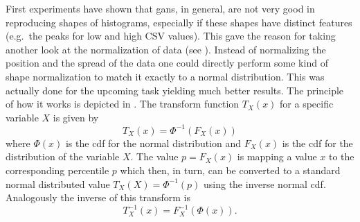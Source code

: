 First experiments have shown that \glspl{gan}, in general, are not very good in reproducing shapes of histograms, especially if these shapes have distinct features (e.g.\ the peaks for low and high CSV values). This gave the reason for taking another look at the normalization of data (see ). Instead of normalizing the position and the spread of the data one could directly perform some kind of shape normalization to match it exactly to a normal distribution. This was actually done for the upcoming task yielding much better results. The principle of how it works is depicted in . The transform function \(T_X(x)\) for a specific variable \(X\) is given by \begin{equation}
    T_X(x) = \Phi^{-1}(F_X(x))
\end{equation}
where \(\Phi(x)\) is the \gls{cdf} for the normal distribution and \(F_X(x)\) is the \gls{cdf} for the distribution of the variable \(X\). The value \(p=F_X(x)\) is mapping a value \(x\) to the corresponding percentile \(p\) which then, in turn, can be converted to a standard normal distributed value \(T_X(X) = \Phi^{-1}(p)\) using the inverse normal \gls{cdf}. Analogously the inverse of this transform is \begin{equation}
    T_X^{-1}(x) = F_X^{-1}(\Phi(x)).
\end{equation}

